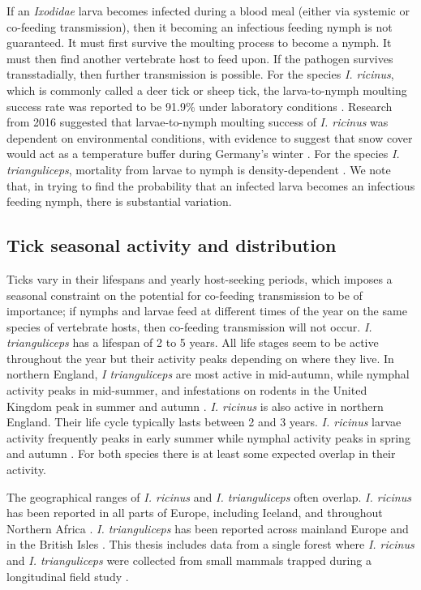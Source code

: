 \documentclass[hidelinks]{article}
\begin{document}
If an \textit{Ixodidae} larva becomes infected during a blood meal (either via systemic or co-feeding transmission), then it becoming an infectious feeding nymph is not guaranteed. It must first survive the moulting process to become a nymph. It must then find another vertebrate host to feed upon. If the pathogen survives transstadially, then further transmission is possible. For the species \textit{I. ricinus}, which is commonly called a deer tick or sheep tick, the larva-to-nymph moulting success rate was reported to be 91.9\% under laboratory conditions \citep{Hurry2021}. Research from 2016 suggested that larvae-to-nymph moulting success of \textit{I. ricinus} was dependent on environmental conditions, with evidence to suggest that snow cover would act as a temperature buffer during Germany's winter \citep{Dautel2016}. For the species \textit{I. trianguliceps}, mortality from larvae to nymph is density-dependent \citep{Randolph1994}. We note that, in trying to find the probability that an infected larva becomes an infectious feeding nymph, there is substantial variation.

\subsection{Tick seasonal activity and distribution}

Ticks vary in their lifespans and yearly host-seeking periods, which imposes a seasonal constraint on the potential for co-feeding transmission to be of importance; if nymphs and larvae feed at different times of the year on the same species of vertebrate hosts, then co-feeding transmission will not occur. \textit{I. trianguliceps} has a lifespan of 2 to 5 years. All life stages seem to be active throughout the year but their activity peaks depending on where they live. In northern England, \textit{I trianguliceps} are most active in mid-autumn, while nymphal activity peaks in mid-summer, and infestations on rodents in the United Kingdom peak in summer and autumn \citep{Pf_ffle_2017}. \textit{I. ricinus} is also active in northern England. Their life cycle typically lasts between 2 and 3 years. \textit{I. ricinus} larvae activity frequently peaks in early summer while nymphal activity peaks in spring and autumn \citep{Otranto_2017}. For both species there is at least some expected overlap in their activity.

The geographical ranges of \textit{I. ricinus} and \textit{I. trianguliceps} often overlap. \textit{I. ricinus} has been reported in all parts of Europe, including Iceland, and throughout Northern Africa \citep{Otranto_2017}. \textit{I. trianguliceps} has been reported across mainland Europe and in the British Isles \citep{Pf_ffle_2017}. This thesis includes data from a single forest where \textit{I. ricinus} and \textit{I. trianguliceps} were collected from small mammals trapped during a longitudinal field study \citep{Bown2008, Bown2011}.
\end{document}
